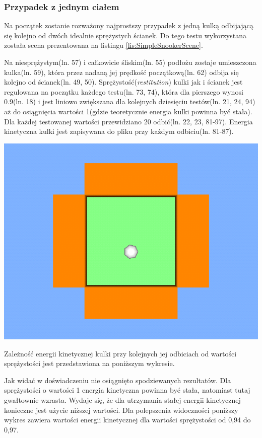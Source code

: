 \subsubsection{Przypadek z jednym ciałem}
Na początek zostanie rozważony najprostszy przypadek z jedną kulką odbijającą
się kolejno od dwóch idealnie sprężystych ścianek. Do tego testu wykorzystana
została scena prezentowana na listingu \ref{lis:SimpleSnookerScene}.
 
Na niesprężystym(ln. 57) i całkowicie śliskim(ln. 55) podłożu zostaje
umieszczona kulka(ln. 59), która przez nadaną jej prędkość początkową(ln. 62)
odbija się kolejno od ścianek(ln. 49, 50). Sprężystość(\emph{restitution}) kulki jak i ścianek jest regulowana na
początku każdego testu(ln. 73, 74), która dla pierszego wynosi 0.9(ln. 18) i
jest liniowo zwiększana dla kolejnych dziesięciu testów(ln. 21, 24, 94) aż do
osiągnięcia wartości 1(gdzie teoretycznie energia kulki powinna być stała).
Dla każdej testowanej wartości przewidziano 20 odbić(ln. 22, 23, 81-97). Energia
kinetyczna kulki jest zapisywana do pliku przy każdym odbiciu(ln. 81-87).

\includegraphics[width=\textwidth]{./img/SimpleSnookerScene.png}

Zależność energii kinetycznej kulki przy kolejnych jej odbiciach od wartości
sprężystości jest przedstawiona na poniższym wykresie.



Jak widać w doświadczeniu nie osiągnięto spodziewanych rezultatów. Dla
sprężystości o wartości 1 energia kinetyczna powinna być stała, natomiast tutaj
gwałtownie wzrasta. Wydaje się, że dla utrzymania stałej energii kinetycznej
konieczne jest użycie niższej wartości. Dla polepszenia widoczności poniższy
wykres zawiera wartości energii kinetycznej dla wartości sprężystości od 0,94 do
0,97.

